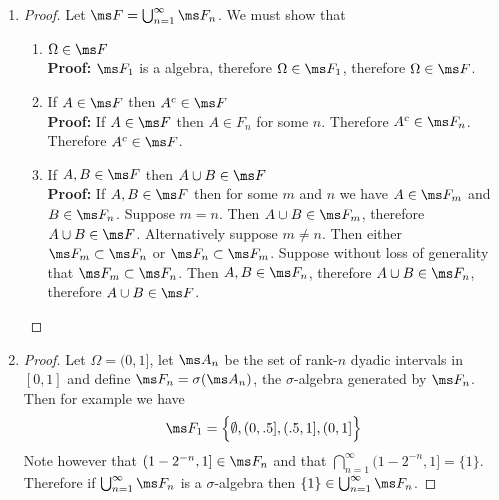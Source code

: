 \begin{enumerate}
  \begin{enumerate}[label=(\alph*)]
  \item
    \begin{proof}
      Let $\ms F = \bigcup_{n=1}^\infty \ms F_n$. We must show that
      \begin{enumerate}
      \item $\Omega \in \ms F$ \\
        {\bf Proof:} $\ms F_1$ is a algebra, therefore $\Omega \in \ms F_1$, therefore $\Omega \in \ms F$.
      \item If $A \in \ms F$ then $A^c \in \ms F$ \\
        {\bf Proof:} If $A \in \ms F$ then $A \in F_n$ for some $n$. Therefore $A^c \in \ms F_n$. Therefore $A^c \in \ms F$.
      \item If $A, B \in \ms F$ then $A \cup B \in \ms F$ \\
        {\bf Proof:} If $A, B \in \ms F$ then for some $m$ and $n$ we have $A \in \ms F_m$ and $B \in \ms F_n$.
        Suppose $m = n$. Then $A \cup B \in \ms F_m$, therefore $A \cup B \in \ms F$. Alternatively
        suppose $m \neq n$. Then either $\ms F_m \subset \ms F_n$ or $\ms F_n \subset \ms F_m$. Suppose without
        loss of generality that $\ms F_m \subset \ms F_n$. Then $A, B \in \ms F_n$,
        therefore $A \cup B \in \ms F_n$, therefore $A \cup B \in \ms F$.
      \end{enumerate}
    \end{proof}
  \item
    \begin{proof}
      Let $\Omega = (0, 1]$, let $\ms A_n$ be the set of rank-$n$ dyadic intervals in $[0, 1]$ and
      define $\ms F_n = \sigma(\ms A_n)$, the $\sigma$-algebra generated by $\ms F_n$. Then for example we have
      \begin{align*}
        \ms F_1 &= \Big\{\emptyset,
                         (0, .5], (.5, 1],
                         (0, 1]
                   \Big\} \\
      \end{align*}
      Note however that $(1 - 2^{-n}, 1] \in \ms F_n$ and that $\bigcap_{n=1}^\infty (1 - 2^{-n}, 1] = \{1\}$.
      Therefore if $\bigcup_{n=1}^\infty \ms F_n$ is a $\sigma$-algebra
      then $\{1\} \in \bigcup_{n=1}^\infty \ms F_n$.


\end{proof}
\end{enumerate}
\end{enumerate}
